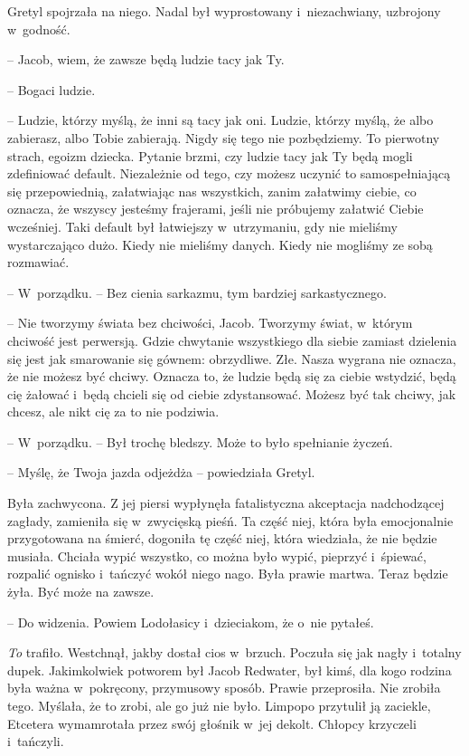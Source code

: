 \documentclass[oneside,polish,11pt,sfheadings]{mwbk}
\begin{document}
Gretyl spojrzała na niego. Nadal był wyprostowany i~niezachwiany,
uzbrojony w~godność.

-- Jacob, wiem, że zawsze będą ludzie tacy jak Ty.

-- Bogaci ludzie.

-- Ludzie, którzy myślą, że inni są tacy jak oni. Ludzie, którzy myślą,
że albo zabierasz, albo Tobie zabierają. Nigdy się tego nie pozbędziemy.
To pierwotny strach, egoizm dziecka. Pytanie brzmi, czy ludzie tacy jak
Ty będą mogli zdefiniować default. Niezależnie od tego, czy możesz
uczynić to samospełniającą się przepowiednią, załatwiając nas
wszystkich, zanim załatwimy ciebie, co oznacza, że wszyscy jesteśmy
frajerami, jeśli nie próbujemy załatwić Ciebie wcześniej. Taki default
był łatwiejszy w~utrzymaniu, gdy nie mieliśmy wystarczająco dużo. Kiedy
nie mieliśmy danych. Kiedy nie mogliśmy ze sobą rozmawiać.

-- W~porządku. -- Bez cienia sarkazmu, tym bardziej sarkastycznego.

-- Nie tworzymy świata bez chciwości, Jacob. Tworzymy świat, w~którym
chciwość jest perwersją. Gdzie chwytanie wszystkiego dla siebie zamiast
dzielenia się jest jak smarowanie się gównem: obrzydliwe. Złe. Nasza
wygrana nie oznacza, że nie możesz być chciwy. Oznacza to, że ludzie
będą się za ciebie wstydzić, będą cię żałować i~będą chcieli się od
ciebie zdystansować. Możesz być tak chciwy, jak chcesz, ale nikt cię za
to nie podziwia.

-- W~porządku. -- Był trochę bledszy. Może to było spełnianie życzeń.

-- Myślę, że Twoja jazda odjeżdża -- powiedziała Gretyl. 

Była zachwycona.
Z jej piersi wypłynęła fatalistyczna akceptacja nadchodzącej zagłady,
zamieniła się w~zwycięską pieśń. Ta część niej, która była emocjonalnie
przygotowana na śmierć, dogoniła tę część niej, która wiedziała, że nie
będzie musiała. Chciała wypić wszystko, co można było wypić, pieprzyć i~śpiewać, rozpalić ognisko i~tańczyć wokół niego nago. Była prawie
martwa. Teraz będzie żyła. Być może na zawsze.

-- Do widzenia. Powiem Lodołasicy i~dzieciakom, że o~nie pytałeś.

\textit{To} trafiło. Westchnął, jakby dostał cios w~brzuch. Poczuła się
jak nagły i~totalny dupek. Jakimkolwiek potworem był Jacob Redwater, był
kimś, dla kogo rodzina była ważna w~pokręcony, przymusowy sposób. Prawie
przeprosiła. Nie zrobiła tego. Myślała, że to zrobi, ale go już nie
było. Limpopo przytulił ją zaciekle, Etcetera wymamrotała przez swój
głośnik w~jej dekolt. Chłopcy krzyczeli i~tańczyli.
\end{document}
